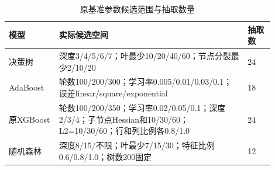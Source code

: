 \begin{table}[htbp]
\small
\setlength{\tabcolsep}{5pt}
\centering
\caption{原基准参数候选范围与抽取数量}
\label{tab:baseline-search}
\begin{tabular}{L{0.17\linewidth}L{0.64\linewidth}L{0.09\linewidth}}
\toprule
模型 & 实际候选空间 & 抽取数 \\
\midrule
决策树 & 深度3/4/5/6/7；叶最少10/20/40/60；节点分裂最少2/10/20 & 24 \\
AdaBoost & 轮数100/200/300；学习率0.005/0.01/0.03/0.1；误差linear/square/exponential & 18 \\
原XGBoost & 轮数100/200/350；学习率0.02/0.05/0.1；深度2/3/4；子节点Hessian和10/30/60；L2=10/30/60；行和列比例各0.8/1.0 & 24 \\
随机森林 & 深度8/15/不限；叶最少7/15/30；特征比例0.6/0.8/1.0；树数200固定 & 12 \\
\bottomrule
\end{tabular}
\end{table}
